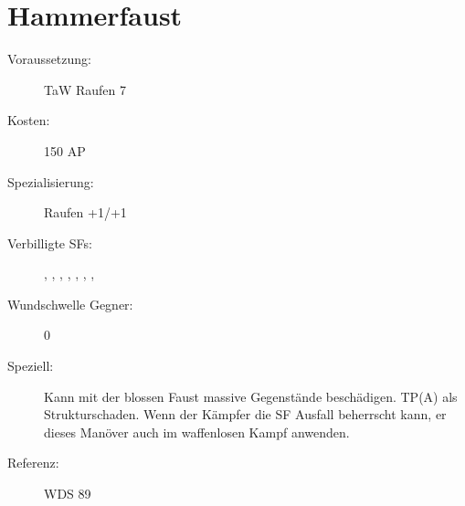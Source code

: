 \section{Hammerfaust}
\label{uSpez.hammerfaust}
\begin{description}
    \item[Voraussetzung:]
        TaW Raufen 7
    \item[Kosten:]
        150 AP
    \item[Spezialisierung:]
        Raufen +1/+1
    \item[Verbilligte SFs:]
        , , , , , , , 
    \item[Wundschwelle Gegner:]
        0
    \item[Speziell:]
        Kann mit der blossen Faust massive Gegenstände beschädigen.
        TP(A) als Strukturschaden.
        Wenn der Kämpfer die SF Ausfall beherrscht kann, er dieses Manöver auch im waffenlosen Kampf anwenden.
    \item [Referenz:]
        WDS 89
\end{description}
